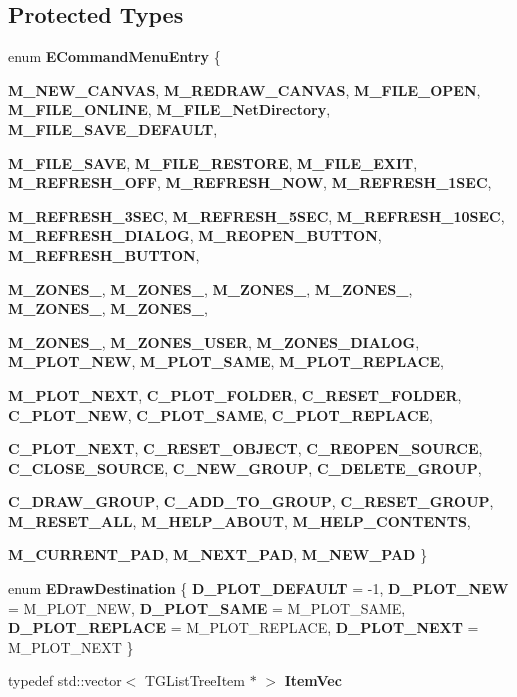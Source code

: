 \subsection*{Protected Types}
\begin{DoxyCompactItemize}
\item 
enum {\bf ECommandMenuEntry} \{ \par
{\bf M\_\-NEW\_\-CANVAS}, 
{\bf M\_\-REDRAW\_\-CANVAS}, 
{\bf M\_\-FILE\_\-OPEN}, 
{\bf M\_\-FILE\_\-ONLINE}, 
{\bf M\_\-FILE\_\-NetDirectory}, 
{\bf M\_\-FILE\_\-SAVE\_\-DEFAULT}, 
\par
{\bf M\_\-FILE\_\-SAVE}, 
{\bf M\_\-FILE\_\-RESTORE}, 
{\bf M\_\-FILE\_\-EXIT}, 
{\bf M\_\-REFRESH\_\-OFF}, 
{\bf M\_\-REFRESH\_\-NOW}, 
{\bf M\_\-REFRESH\_\-1SEC}, 
\par
{\bf M\_\-REFRESH\_\-3SEC}, 
{\bf M\_\-REFRESH\_\-5SEC}, 
{\bf M\_\-REFRESH\_\-10SEC}, 
{\bf M\_\-REFRESH\_\-DIALOG}, 
{\bf M\_\-REOPEN\_\-BUTTON}, 
{\bf M\_\-REFRESH\_\-BUTTON}, 
\par
{\bf M\_\-ZONES\_}, 
{\bf M\_\-ZONES\_}, 
{\bf M\_\-ZONES\_}, 
{\bf M\_\-ZONES\_}, 
{\bf M\_\-ZONES\_}, 
{\bf M\_\-ZONES\_}, 
\par
{\bf M\_\-ZONES\_}, 
{\bf M\_\-ZONES\_\-USER}, 
{\bf M\_\-ZONES\_\-DIALOG}, 
{\bf M\_\-PLOT\_\-NEW}, 
{\bf M\_\-PLOT\_\-SAME}, 
{\bf M\_\-PLOT\_\-REPLACE}, 
\par
{\bf M\_\-PLOT\_\-NEXT}, 
{\bf C\_\-PLOT\_\-FOLDER}, 
{\bf C\_\-RESET\_\-FOLDER}, 
{\bf C\_\-PLOT\_\-NEW}, 
{\bf C\_\-PLOT\_\-SAME}, 
{\bf C\_\-PLOT\_\-REPLACE}, 
\par
{\bf C\_\-PLOT\_\-NEXT}, 
{\bf C\_\-RESET\_\-OBJECT}, 
{\bf C\_\-REOPEN\_\-SOURCE}, 
{\bf C\_\-CLOSE\_\-SOURCE}, 
{\bf C\_\-NEW\_\-GROUP}, 
{\bf C\_\-DELETE\_\-GROUP}, 
\par
{\bf C\_\-DRAW\_\-GROUP}, 
{\bf C\_\-ADD\_\-TO\_\-GROUP}, 
{\bf C\_\-RESET\_\-GROUP}, 
{\bf M\_\-RESET\_\-ALL}, 
{\bf M\_\-HELP\_\-ABOUT}, 
{\bf M\_\-HELP\_\-CONTENTS}, 
\par
{\bf M\_\-CURRENT\_\-PAD}, 
{\bf M\_\-NEXT\_\-PAD}, 
{\bf M\_\-NEW\_\-PAD}
 \}
\item 
enum {\bf EDrawDestination} \{ {\bf D\_\-PLOT\_\-DEFAULT} =  -\/1, 
{\bf D\_\-PLOT\_\-NEW} =  M\_\-PLOT\_\-NEW, 
{\bf D\_\-PLOT\_\-SAME} =  M\_\-PLOT\_\-SAME, 
{\bf D\_\-PLOT\_\-REPLACE} =  M\_\-PLOT\_\-REPLACE, 
{\bf D\_\-PLOT\_\-NEXT} =  M\_\-PLOT\_\-NEXT
 \}
\item 
typedef std::vector$<$ TGListTreeItem $\ast$ $>$ {\bf ItemVec}
\end{DoxyCompactItemize}
